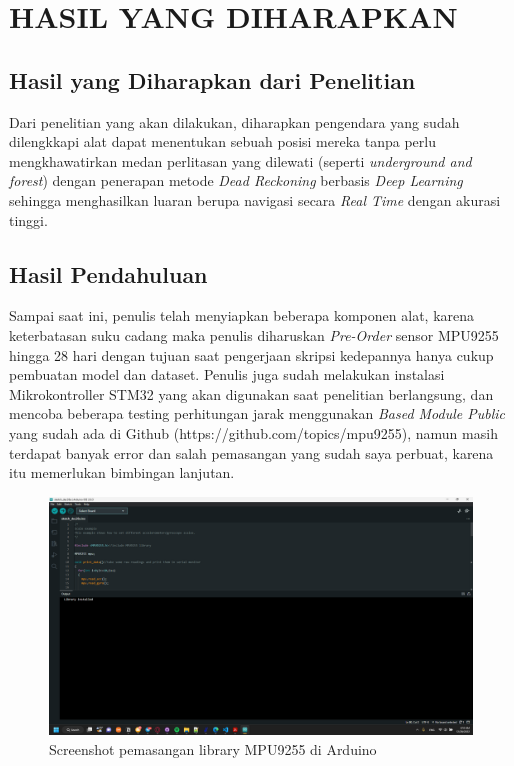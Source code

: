 \chapter{HASIL YANG DIHARAPKAN}

\section{Hasil yang Diharapkan dari Penelitian}

Dari penelitian yang akan dilakukan, diharapkan pengendara yang sudah dilengkkapi alat dapat menentukan sebuah posisi 
mereka tanpa perlu mengkhawatirkan medan perlitasan yang dilewati (seperti \emph{underground and forest}) dengan 
penerapan metode \emph{Dead Reckoning} berbasis \emph{Deep Learning} sehingga menghasilkan luaran berupa navigasi 
secara \emph{Real Time} dengan akurasi tinggi.

\section{Hasil Pendahuluan}

Sampai saat ini, penulis telah menyiapkan beberapa komponen alat, karena keterbatasan suku cadang maka penulis diharuskan 
\emph{Pre-Order} sensor MPU9255 hingga 28 hari dengan tujuan saat pengerjaan skripsi kedepannya hanya cukup pembuatan model dan dataset. 
Penulis juga sudah melakukan instalasi Mikrokontroller STM32 yang akan digunakan saat penelitian berlangsung, dan mencoba beberapa 
testing perhitungan jarak menggunakan \emph{Based Module Public} yang sudah ada di Github (https://github.com/topics/mpu9255), 
namun masih terdapat banyak error dan salah pemasangan yang sudah saya perbuat, karena itu memerlukan bimbingan lanjutan.

\begin{figure} [ht] \centering
    \includegraphics[scale=0.25]{gambar/Screenshot-2022-12-05.png}
    \caption{Screenshot pemasangan library MPU9255 di Arduino}
    \label{fig:lib-MPU9255}
  \end{figure}